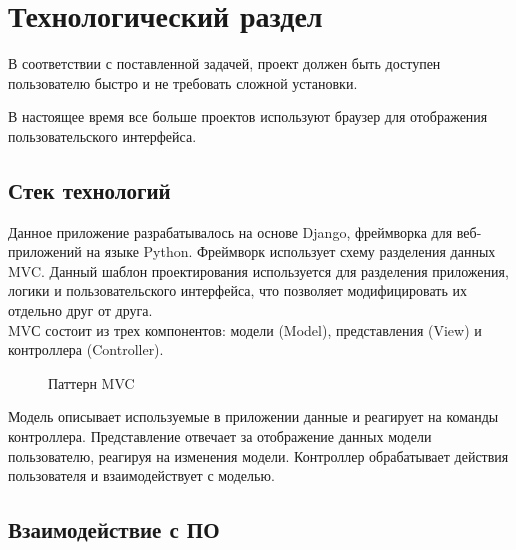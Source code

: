 \section{Технологический раздел }

В соответствии с поставленной задачей, проект должен быть доступен пользователю быстро и не требовать сложной установки.

В настоящее время все больше проектов используют браузер для отображения пользовательского интерфейса.

\subsection{Стек технологий}

Данное приложение разрабатывалось на основе Django, фреймворка для веб-приложений на языке Python. Фреймворк использует схему разделения данных MVC. Данный шаблон проектирования используется для разделения приложения, логики и пользовательского интерфейса, что позволяет модифицировать их отдельно друг от друга.
\\

MVС состоит из трех компонентов: модели (Model), представления (View) и контроллера (Controller).  

\begin{figure}[H]
\caption{Паттерн MVC}
\end{figure}

Модель описывает используемые в приложении данные и реагирует на команды контроллера. Представление отвечает за отображение данных модели пользователю, реагируя на изменения модели. Контроллер обрабатывает действия пользователя и взаимодействует с моделью.
\pagebreak

\subsection{Взаимодействие с ПО}



\pagebreak
